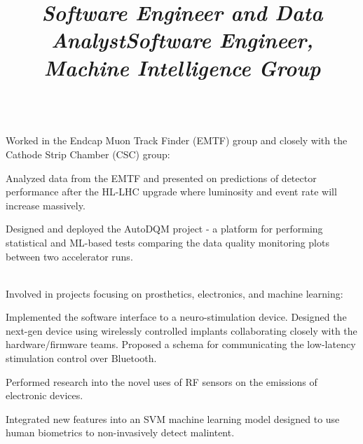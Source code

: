 \documentclass[margin,line,11pt,letterpaper]{res}
\begin{document}
\begin{resume}
    \title{\textit{Software Engineer and Data Analyst}}
    \begin{position}
        \vspace{-3mm}\\
        Worked in the Endcap Muon Track Finder (EMTF) group and closely with the Cathode Strip Chamber (CSC) group:
        \begin{list2}
            \item Analyzed data from the EMTF and presented on predictions of detector performance after the HL-LHC upgrade where luminosity and event rate will increase massively.
            \item Designed and deployed the AutoDQM project - a platform for performing statistical and ML-based tests comparing the data quality monitoring plots between two accelerator runs.
        \end{list2}
    \end{position}

    \title{\textit{Software Engineer, Machine Intelligence Group}}
    \begin{position}
        \vspace{-3mm}\\
        Involved in projects focusing on prosthetics, electronics, and machine learning:
        \begin{list2}
            \item Implemented the software interface to a neuro-stimulation device.
            Designed the next-gen device using wirelessly controlled implants collaborating closely with the hardware/firmware teams. 
            Proposed a schema for communicating the low-latency stimulation control over Bluetooth.
            \item Performed research into the novel uses of RF sensors on the emissions of electronic devices.
            \item Integrated new features into an SVM machine learning model designed to use human biometrics to non-invasively detect malintent.
        \end{list2}
    \end{position}
    

\end{resume}
\end{document}
